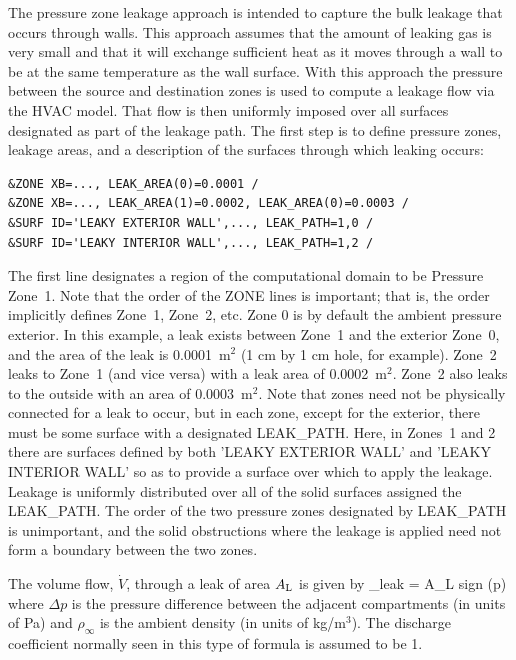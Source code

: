 \documentclass[11pt]{book}
\begin{document}
The pressure zone leakage approach is intended to capture the bulk leakage that occurs through walls. This approach assumes that the amount of leaking gas is very small and that it will exchange sufficient heat as it moves through a wall to be at the same temperature as the wall surface. With this approach the pressure between the source and destination zones is used to compute a leakage flow via the HVAC model. That flow is then uniformly imposed over all surfaces designated as part of the leakage path. The first step is to define pressure zones, leakage areas, and a description of the surfaces through which leaking occurs:
\begin{lstlisting}
&ZONE XB=..., LEAK_AREA(0)=0.0001 /
&ZONE XB=..., LEAK_AREA(1)=0.0002, LEAK_AREA(0)=0.0003 /
&SURF ID='LEAKY EXTERIOR WALL',..., LEAK_PATH=1,0 /
&SURF ID='LEAKY INTERIOR WALL',..., LEAK_PATH=1,2 /
\end{lstlisting}
The first line designates a region of the computational domain to be Pressure Zone~1. Note that the order of the {\ct ZONE} lines is important; that is, the order implicitly defines Zone~1, Zone~2, etc. Zone 0 is by default the ambient pressure exterior. In this example, a leak exists between Zone~1 and the exterior Zone~0, and the area of the leak is 0.0001~m$^2$ (1 cm by 1 cm hole, for example). Zone~2 leaks to Zone~1 (and vice versa) with a leak area of 0.0002~m$^2$. Zone~2 also leaks to the outside with an area of 0.0003~m$^2$. Note that zones need not be physically connected for a leak to occur, but in each zone, except for the exterior, there must be some surface with a designated {\ct LEAK\_PATH}. Here, in Zones~1 and 2 there are surfaces defined by both {\ct 'LEAKY EXTERIOR WALL'} and {\ct 'LEAKY INTERIOR WALL'} so as to provide a surface over which to apply the leakage. Leakage is uniformly distributed over all of the solid surfaces assigned the {\ct LEAK\_PATH}. The order of the two pressure zones designated by {\ct LEAK\_PATH} is unimportant, and the solid obstructions where the leakage is applied need not form a boundary between the two zones.

The volume flow, $\dot{V}$, through a leak of area $A_{\rm L}$ is given by
\be  {}_{\rm leak} = A_{\rm L} \; \hbox{sign} (\Delta p) \;  \ee
where $\Delta p$ is the pressure difference between the adjacent compartments (in units of Pa) and $\rho_\infty$ is the ambient density (in units of kg/m$^3$). The discharge coefficient normally seen in this type of formula is assumed to be 1.
\end{document}
